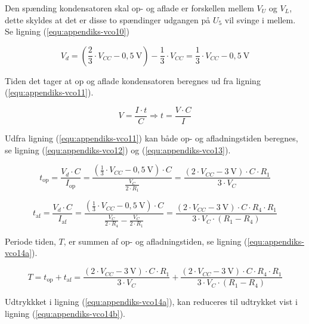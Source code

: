 Den spænding kondensatoren skal op- og aflade er forskellen mellem $V_U$ og $V_L$, dette skyldes at det er disse to spændinger udgangen på $U_5$ vil svinge i mellem. Se ligning (\ref{equ:appendiks-vco10})

\begin{equation}
\label{equ:appendiks-vco10}
V_d = \left(\frac{2}{3} \cdot V_{CC} - 0,5~\mathrm{V}\right) - \frac{1}{3} \cdot V_{CC} = \frac{1}{3} \cdot V_{CC} - 0,5~\mathrm{V}
\end{equation}

Tiden det tager at op og aflade kondensatoren beregnes ud fra ligning (\ref{equ:appendiks-vco11}).

\begin{equation}
\label{equ:appendiks-vco11}
V = \frac{I \cdot t}{C} \Rightarrow t = \frac{V \cdot C}{I}
\end{equation}

Udfra ligning (\ref{equ:appendiks-vco11}) kan både op- og afladningstiden beregnes, se ligning (\ref{equ:appendiks-vco12}) og (\ref{equ:appendiks-vco13}).

\begin{equation}
\label{equ:appendiks-vco12}
t_{\mathrm{op}} = \frac{V_d \cdot C}{I_{\mathrm{op}}} = \frac{\left(\frac{1}{3} \cdot V_{CC} - 0,5~\mathrm{V}\right) \cdot C}{\frac{V_C}{2 \cdot R_1}} = \frac{(2 \cdot V_{CC} - 3~\mathrm{V}) \cdot C \cdot R_1}{3 \cdot V_C}
\end{equation}

\begin{equation}
\label{equ:appendiks-vco13}
t_{\mathrm{af}} = \frac{V_d \cdot C}{I_{\mathrm{af}}} = \frac{\left(\frac{1}{3} \cdot V_{CC} - 0,5~\mathrm{V}\right) \cdot C}{\frac{V_C}{2 \cdot R_4} - \frac{V_C}{2 \cdot R_1}} = \frac{(2 \cdot V_{CC} - 3~\mathrm{V}) \cdot C \cdot R_4 \cdot R_1}{3 \cdot V_C \cdot (R_1 - R_4)}
\end{equation}

Periode tiden, $T$, er summen af op- og afladningstiden, se ligning (\ref{equ:appendiks-vco14a}).

\begin{equation}
\label{equ:appendiks-vco14a}
T = t_{\mathrm{op}} + t_{\mathrm{af}} = \frac{(2 \cdot V_{CC} - 3~\mathrm{V}) \cdot C \cdot R_1}{3 \cdot V_C} + \frac{(2 \cdot V_{CC} - 3~\mathrm{V}) \cdot C \cdot R_4 \cdot R_1}{3 \cdot V_C \cdot (R_1 - R_4)}
\end{equation}

Udtrykkket i ligning (\ref{equ:appendiks-vco14a}), kan reduceres til udtrykket vist i ligning (\ref{equ:appendiks-vco14b}).

